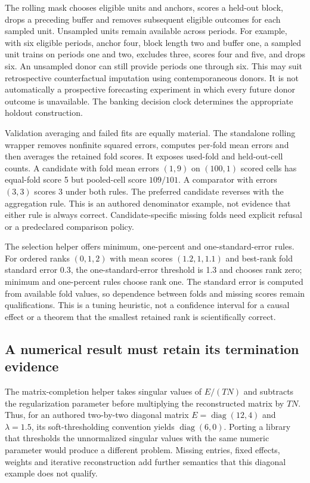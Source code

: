 The rolling mask chooses eligible units and anchors, scores a held-out
block, drops a preceding buffer and removes subsequent eligible outcomes
for each sampled unit. Unsampled units remain available across periods.
For example, with six eligible periods, anchor four, block length two and
buffer one, a sampled unit trains on periods one and two, excludes three,
scores four and five, and drops six. An unsampled donor can still provide
periods one through six. This may suit retrospective counterfactual
imputation using contemporaneous donors. It is not automatically a
prospective forecasting experiment in which every future donor outcome
is unavailable. The banking decision clock determines the appropriate
holdout construction.~\citep{exec24_fect_source,exec24_fect_choice}

Validation averaging and failed fits are equally material. The standalone
rolling wrapper removes nonfinite squared errors, computes per-fold mean
errors and then averages the retained fold scores. It exposes used-fold
and held-out-cell counts. A candidate with fold mean errors $(1,9)$ on
$(100,1)$ scored cells has equal-fold score 5 but pooled-cell score
$109/101$. A comparator with errors $(3,3)$ scores 3 under both rules.
The preferred candidate reverses with the aggregation rule. This is an
authored denominator example, not evidence that either rule is always
correct. Candidate-specific missing folds need explicit refusal or a
predeclared comparison policy.~\citep{exec24_fect_source,exec24_fect_choice}

The selection helper offers minimum, one-percent and one-standard-error
rules. For ordered ranks $(0,1,2)$ with mean scores $(1.2,1,1.1)$ and
best-rank fold standard error 0.3, the one-standard-error threshold is 1.3
and chooses rank zero; minimum and one-percent rules choose rank one.
The standard error is computed from available fold values, so dependence
between folds and missing scores remain qualifications. This is a tuning
heuristic, not a confidence interval for a causal effect or a theorem that
the smallest retained rank is scientifically correct.
\citep{exec24_fect_source,exec24_fect_choice}

\subsection{A numerical result must retain its termination evidence}
The matrix-completion helper takes singular values of $E/(TN)$ and
subtracts the regularization parameter before multiplying the reconstructed
matrix by $TN$. Thus, for an authored two-by-two diagonal matrix
$E=\operatorname{diag}(12,4)$ and $\lambda=1.5$, its soft-thresholding
convention yields $\operatorname{diag}(6,0)$. Porting a library that
thresholds the unnormalized singular values with the same numeric
parameter would produce a different problem. Missing entries, fixed
effects, weights and iterative reconstruction add further semantics that
this diagonal example does not qualify.~\citep{exec24_fect_source,exec24_fect_choice}

